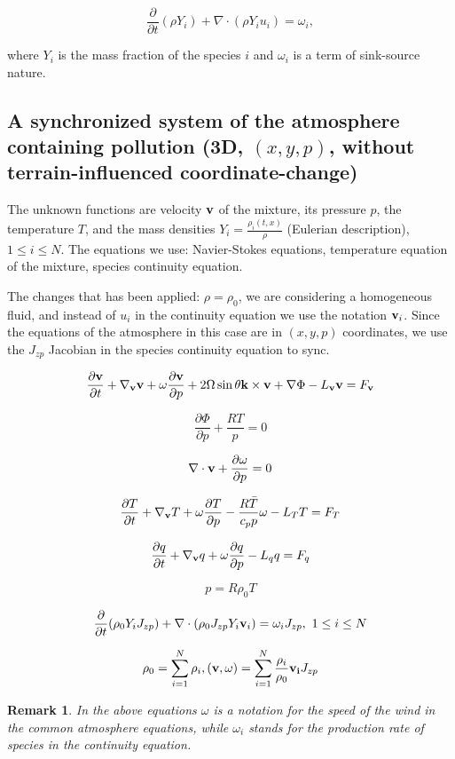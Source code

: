 \documentclass{article}
\newtheorem*{remark}{Remark}
\begin{document}
\[ \frac{\partial}{\partial t} (\rho Y_i) + \nabla \cdot (\rho Y_i u_i) = \omega_i,\]

where $Y_i$ is the mass fraction of the species $i$ and $\omega_i$ is a term of sink-source nature. 

\subsection{A synchronized system of the atmosphere containing pollution (3D, $(x,y,p)$, without terrain-influenced coordinate-change)}

The unknown functions are velocity $\bold{v}$ of the mixture, its pressure $p$, the temperature $T$, and the mass densities $Y_i = \frac{\rho_i (t,x)}{\rho}$ (Eulerian description), $1 \leq i \leq N.$
The equations we use: Navier-Stokes equations, temperature equation of the mixture, species continuity equation.

The changes that has been applied: $\rho = \rho_0$, we are considering a homogeneous fluid, and instead of $u_i$ in the continuity equation we use the notation $\bold{v}_i$. Since the equations of the atmosphere in this case are in $(x,y,p)$ coordinates, we use the $J_{zp}$ Jacobian in the species continuity equation to sync.

\[ \frac{\partial \bold{v}}{\partial t} + \nabla_{\bold{v}}\bold{v} + \omega \frac{\partial \bold{v}}{\partial p} + 2 \Omega \sin \theta \bold{k} \times \bold{v} + \nabla \Phi -L_{\bold{v}} \bold{v} = F_\bold{v}  \]

\[ \frac{\partial \Phi}{\partial p} + \frac{RT}{p} = 0 \]

\[ \nabla \cdot \bold{v} + \frac{\partial \omega}{\partial p} = 0\]

\[ \frac{\partial T}{\partial t} + \nabla_{\bold{v}} T + \omega \frac{\partial T}{\partial p} - \frac{R \bar{T}}{c_p p} \omega - L_T T = F_T\]

\[ \frac{\partial q}{\partial t} + \nabla_{\bold{v}}q + \omega \frac{\partial q}{\partial p} -L_q q = F_q \]

\[ p = R \rho_0 T\]

\[ \frac{\partial}{\partial t} (\rho_0 Y_i J_{zp}) + \nabla \cdot (\rho_0 J_{zp} Y_i \bold{v}_i) = \omega_i J_{zp}, \text{  } 1 \leq i \leq N \]

\[ \rho_0 = \sum_{i =1}^{N} \rho_i, (\bold{v}, \omega) = \sum_{i =1}^{N}\frac{\rho_i}{\rho_0} \bold{v_i}J_{zp} \]

\begin{remark}
In the above equations $\omega$ is a notation for the speed of the wind in the common atmosphere equations, while $\omega_i$ stands for the production rate of species in the continuity equation.
\end{remark}
\end{document}
